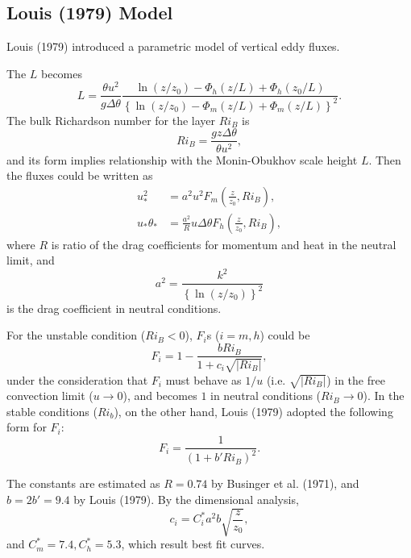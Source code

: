 \subsection{Louis (1979) Model}
Louis (1979) introduced a parametric model of vertical eddy fluxes.

The $L$ becomes
\begin{equation}
  L = \frac{\theta u^2}{g\Delta\theta}
    \frac{\ln(z/z_0)-\Phi_h(z/L)+\Phi_h(z_0/L)}{\left\{\ln(z/z_0)-\Phi_m(z/L)+\Phi_m(z/L)\right\}^2}.
\end{equation}
The bulk Richardson number for the layer $Ri_B$ is
\begin{equation}
  Ri_B = \frac{gz\Delta\theta}{\theta u^2},
\end{equation}
and its form implies relationship with the Monin-Obukhov scale height $L$.
Then the fluxes could be written as
\begin{align}
  u_*^2 &= a^2 u^2 F_m\left(\frac{z}{z_0},Ri_B\right), \label{eq: u_*^2} \\
  u_*\theta_* &= \frac{a^2}{R} u \Delta \theta F_h\left(\frac{z}{z_0},Ri_B\right), \label{eq: u_*t_*}
\end{align}
where
$R$ is ratio of the drag coefficients for momentum and heat in the neutral limit, and
\begin{equation}
  a^2 = \frac{k^2}{\left\{\ln\left(z/z_0\right)\right\}^2}
\end{equation}
is the drag coefficient in neutral conditions.

For the unstable condition ($Ri_B<0$),
$F_i$s ($i=m,h$) could be
\begin{equation}
  F_i = 1 - \frac{b Ri_B}{1 + c_i \sqrt{|Ri_B|}},
\end{equation}
under the consideration that
$F_i$ must behave as $1/u$ (i.e. $\sqrt{|Ri_B|}$) in the free convection limit ($u \to 0$),
and becomes $1$ in neutral conditions ($Ri_B \to 0$).
In the stable conditions ($Ri_b$), on the other hand,
Louis (1979) adopted the following form for $F_i$:
\begin{equation}
  F_i = \frac{1}{(1 + b' Ri_B)^2}.
  \label{eq: F_i stable}
\end{equation}

The constants are estimated as
$R=0.74$ by Businger et al. (1971),
and $b=2b'=9.4$ by Louis (1979).
By the dimensional analysis,
\begin{equation}
  c_i = C^*_i a^2 b \sqrt{\frac{z}{z_0}},
\end{equation}
and $C^*_m = 7.4, C^*_h = 5.3$, which result best fit curves.



